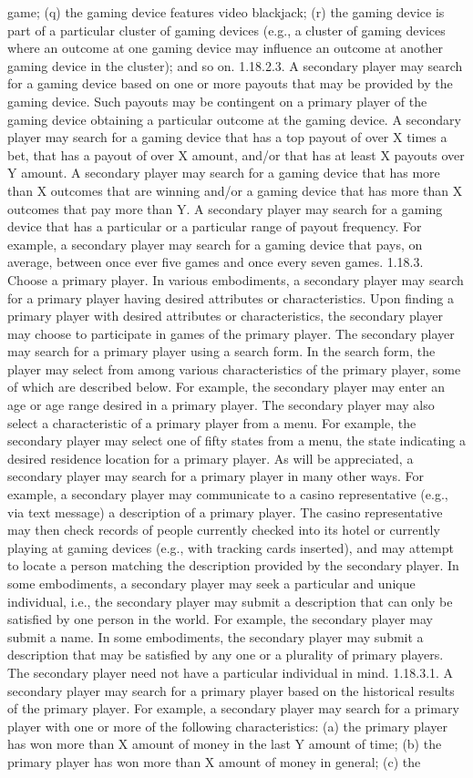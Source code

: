 \documentclass[11pt,a4paper]{article}
\begin{document}
game; (q) the gaming device features video blackjack; (r) the gaming device is part of a particular cluster of gaming devices (e.g., a cluster of gaming devices where an outcome at one gaming device may influence an outcome at another gaming device in the cluster); and so on. 1.18.2.3. A secondary player may search for a gaming device based on one or more payouts that may be provided by the gaming device. Such payouts may be contingent on a primary player of the gaming device obtaining a particular outcome at the gaming device. A secondary player may search for a gaming device that has a top payout of over X times a bet, that has a payout of over X amount, and/or that has at least X payouts over Y amount. A secondary player may search for a gaming device that has more than X outcomes that are winning and/or a gaming device that has more than X outcomes that pay more than Y. A secondary player may search for a gaming device that has a particular or a particular range of payout frequency. For example, a secondary player may search for a gaming device that pays, on average, between once ever five games and once every seven games. 1.18.3. Choose a primary player. In various embodiments, a secondary player may search for a primary player having desired attributes or characteristics. Upon finding a primary player with desired attributes or characteristics, the secondary player may choose to participate in games of the primary player. The secondary player may search for a primary player using a search form. In the search form, the player may select from among various characteristics of the primary player, some of which are described below. For example, the secondary player may enter an age or age range desired in a primary player. The secondary player may also select a characteristic of a primary player from a menu. For example, the secondary player may select one of fifty states from a menu, the state indicating a desired residence location for a primary player. As will be appreciated, a secondary player may search for a primary player in many other ways. For example, a secondary player may communicate to a casino representative (e.g., via text message) a description of a primary player. The casino representative may then check records of people currently checked into its hotel or currently playing at gaming devices (e.g., with tracking cards inserted), and may attempt to locate a person matching the description provided by the secondary player. In some embodiments, a secondary player may seek a particular and unique individual, i.e., the secondary player may submit a description that can only be satisfied by one person in the world. For example, the secondary player may submit a name. In some embodiments, the secondary player may submit a description that may be satisfied by any one or a plurality of primary players. The secondary player need not have a particular individual in mind. 1.18.3.1. A secondary player may search for a primary player based on the historical results of the primary player. For example, a secondary player may search for a primary player with one or more of the following characteristics: (a) the primary player has won more than X amount of money in the last Y amount of time; (b) the primary player has won more than X amount of money in general; (c) the 
\end{document}
